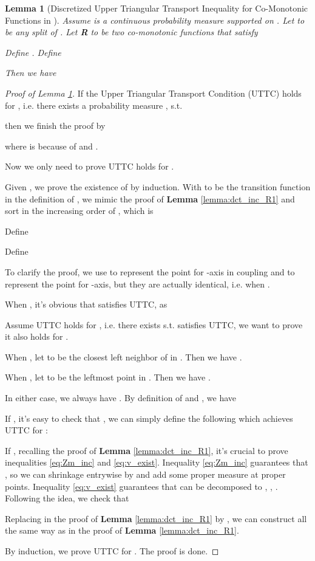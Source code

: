 \documentclass[nohyperref]{article}
\theoremstyle{plain}
\newtheorem{Lemma}{\textbf{Lemma}}
\begin{document}
\begin{Lemma}[Discretized Upper Triangular Transport Inequality for Co-Monotonic Functions in ]
Assume  is a continuous probability measure supported on .
Let  to be any split of .
Let  \textbf{R} to be two co-monotonic functions that satisfy

Define . 
Define 

Then we have

\label{lemma:dct_R1}
\end{Lemma}

\begin{proof}[Proof of Lemma \ref{lemma:dct_R1}]

If the Upper Triangular Transport Condition (UTTC) holds for , i.e. there exists a probability measure , s.t. 

then we finish the proof by

where  is because of  and .

Now we only need to prove UTTC holds for .

Given , we prove the existence of  by induction.
With  to be the transition function in the definition of , we mimic the proof of \textbf{Lemma} \ref{lemma:dct_inc_R1} and sort  in the increasing order of ,
which is 


Define 


Define 
 

To clarify the proof, we use  to represent the point for -axis in coupling and  to represent the point for -axis, but they are actually identical, i.e.  when . 

When , it's obvious that  satisfies UTTC, as 


Assume UTTC holds for , i.e. there exists  s.t.  satisfies UTTC, we want to prove it also holds for .

When , let  to be the closest left neighbor of  in .
Then we have .

When , let  to be the leftmost point in . 
Then we have .

In either case, we always have .
By definition of  and , we have



If , it's easy to check that 
, 
we can simply define the following  which achieves UTTC for :


If , recalling the proof of \textbf{Lemma} \ref{lemma:dct_inc_R1}, it's crucial to prove inequalities \eqref{eq:Zm_inc} and \eqref{eq:v_exist}.
Inequality \eqref{eq:Zm_inc} guarantees that , so we can shrinkage  entrywise by  and add some proper measure at proper points.
Inequality \eqref{eq:v_exist} guarantees that  can be decomposed to , , .
Following the idea, we check that 



Replacing  in the proof of \textbf{Lemma} \ref{lemma:dct_inc_R1} by , we can construct  all the same way as in the proof of \textbf{Lemma} \ref{lemma:dct_inc_R1}.

By induction, we prove UTTC for .
The proof is done.
\end{proof}
\end{document}
